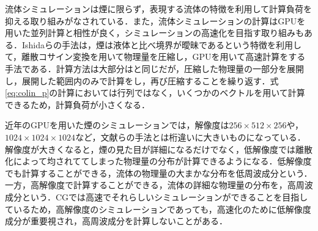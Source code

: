 \documentclass[10pt,a4paper,notitlepage,oneside,twocolumn]{abst_jsarticle}
\begin{document}
流体シミュレーションは煙に限らず，表現する流体の特徴を利用して計算負荷を抑える取り組みがなされている．また，流体シミュレーションの計算はGPUを用いた並列計算と相性が良く，シミュレーションの高速化を目指す取り組みもある．Ishidaらの手法\cite{GPU}は，煙は液体と比べ境界が曖昧であるという特徴を利用して，離散コサイン変換を用いて物理量を圧縮し，GPUを用いて高速計算をする手法である．計算方法は大部分は\cite{fedkiew}と同じだが，圧縮した物理量の一部分を展開し，展開した範囲内のみで計算をし，再び圧縮することを繰り返す．式\ref{eq:colin_p}の計算においては行列ではなく，いくつかのベクトルを用いて計算できるため，計算負荷が小さくなる．

近年のGPUを用いた煙のシミュレーションでは，解像度は$256\times512\times256$や，$1024\times1024\times1024$など，文献\cite{fedkiew}らの手法とは桁違いに大きいものになっている．解像度が大きくなると，煙の見た目が詳細になるだけでなく，低解像度では離散化によって均されててしまった物理量の分布が計算できるようになる．低解像度でも計算することができる，流体の物理量の大まかな分布を低周波成分という．一方，高解像度で計算することができる，流体の詳細な物理量の分布を，高周波成分という．CGでは高速でそれらしいシミュレーションができることを目指しているため，高解像度のシミュレーションであっても，高速化のために低解像度成分が重要視され，高周波成分を計算しないことがある．
\end{document}
